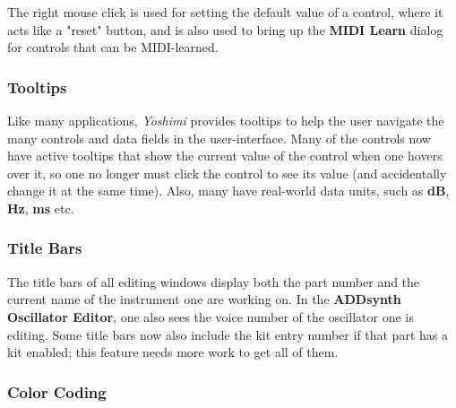 

    The right mouse click is used for setting the default value of a control,
    where it acts like a "reset" button, and is also used to bring up the
    \textbf{MIDI Learn} dialog for controls that can be MIDI-learned.
   
\subsubsection{Tooltips}
\label{subsubsec:stock_settings_tooltips}

   Like many applications, \textsl{Yoshimi} provides tooltips to help the user
   navigate the many controls and data fields in the user-interface.  Many of
   the controls now have active tooltips that show the current value of the
   control when one hovers over it, so one no longer must click the control to
   see its value (and accidentally change it at the same time). Also, many have
   real-world data units, such as \textbf{dB}, \textbf{Hz}, \textbf{ms} etc.

\subsubsection{Title Bars}
\label{subsubsec:stock_settings_elements_title_bars}

   The title bars of all editing windows display both the part number and the
   current name of the instrument one are working on.  In the
   \textbf{ADDsynth Oscillator Editor}, one also sees the
   voice number of the oscillator one is editing.  Some title bars now also
   include the kit entry number if that part has a kit enabled; this feature
   needs more work to get all of them.

\subsubsection{Color Coding}
\label{subsubsec:stock_settings_elements_color_coding}

